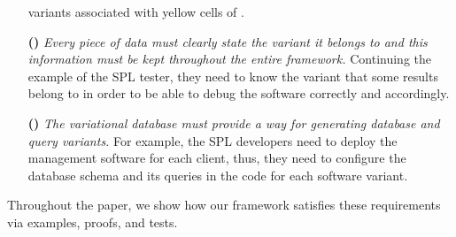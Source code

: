 \begin{enumerate}
 variants associated with yellow cells of . 
%
%
%
\item [\textbf{(\nTwo)}]
\emph{Every piece of data must clearly state the variant it belongs to and 
this information must be kept throughout the entire framework.}
Continuing the example of the SPL tester, they need to know the variant that
some results belong to in order to be able to debug the software correctly and
accordingly. 
%
%
%
\item [\textbf{(\nThree)}]
\emph{The variational database must provide a way for generating database
and query variants.}
For example, the SPL developers need to deploy the management software for each client,
thus, they need to configure the database schema and its queries in the code 
for each software variant.  
%
%
%
\end{enumerate}

Throughout the paper,
we show how our framework satisfies these requirements 
via examples, proofs, and tests.